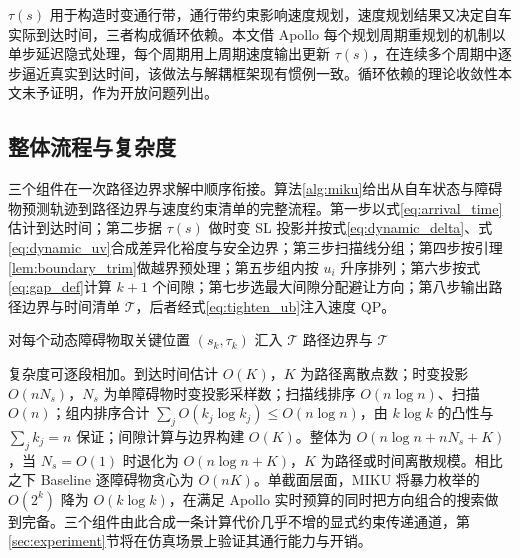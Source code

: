 \documentclass[a4paper,11pt]{ctexart}
\theoremstyle{definition}
\begin{document}
$\tau(s)$ 用于构造时变通行带，通行带约束影响速度规划，速度规划结果又决定自车实际到达时间，三者构成循环依赖。本文借 Apollo 每个规划周期重规划的机制以单步延迟隐式处理，每个周期用上周期速度输出更新 $\tau(s)$，在连续多个周期中逐步逼近真实到达时间，该做法与解耦框架现有惯例一致。循环依赖的理论收敛性本文未予证明，作为开放问题列出。

\subsection{整体流程与复杂度}
\label{sec:method_algorithm}

三个组件在一次路径边界求解中顺序衔接。算法\ref{alg:miku}给出从自车状态与障碍物预测轨迹到路径边界与速度约束清单的完整流程。第一步以式\eqref{eq:arrival_time}估计到达时间；第二步据 $\tau(s)$ 做时变 SL 投影并按式\eqref{eq:dynamic_delta}、式\eqref{eq:dynamic_uv}合成差异化裕度与安全边界；第三步扫描线分组；第四步按引理\ref{lem:boundary_trim}做越界预处理；第五步组内按 $u_i$ 升序排列；第六步按式\eqref{eq:gap_def}计算 $k+1$ 个间隙；第七步选最大间隙分配避让方向；第八步输出路径边界与时间清单 $\mathcal{T}$，后者经式\eqref{eq:tighten_ub}注入速度 QP。

\begin{algorithm}[htbp]
\caption{MIKU 多障碍物统一规划求解}
\label{alg:miku}
对每个动态障碍物取关键位置 $(s_k, \tau_k)$ 汇入 $\mathcal{T}$\;
\KwRet 路径边界与 $\mathcal{T}$
\end{algorithm}

复杂度可逐段相加。到达时间估计 $O(K)$，$K$ 为路径离散点数；时变投影 $O(n N_s)$，$N_s$ 为单障碍物时变投影采样数；扫描线排序 $O(n\log n)$、扫描 $O(n)$；组内排序合计 $\sum_j O(k_j\log k_j)\leq O(n\log n)$，由 $k\log k$ 的凸性与 $\sum_j k_j = n$ 保证；间隙计算与边界构建 $O(K)$。整体为 $O(n\log n + n N_s + K)$，当 $N_s=O(1)$ 时退化为 $O(n\log n + K)$，$K$ 为路径或时间离散规模。相比之下 Baseline 逐障碍物贪心为 $O(nK)$。单截面层面，MIKU 将暴力枚举的 $O(2^k)$ 降为 $O(k\log k)$，在满足 Apollo 实时预算的同时把方向组合的搜索做到完备。三个组件由此合成一条计算代价几乎不增的显式约束传递通道，第\ref{sec:experiment}节将在仿真场景上验证其通行能力与开销。
\end{document}
